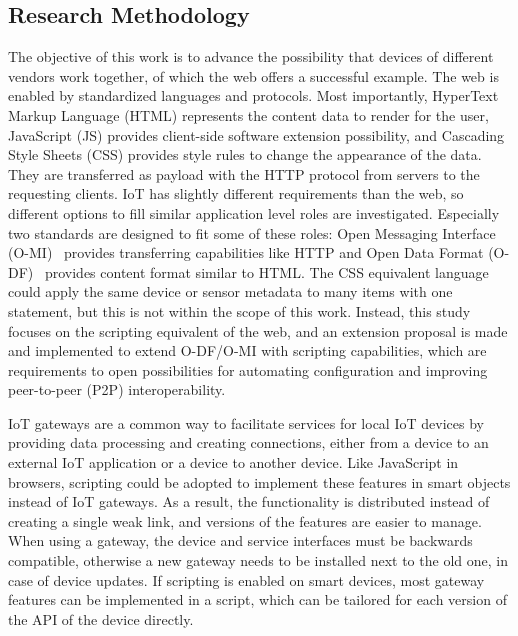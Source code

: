 




\subsection*{Research Methodology}

The objective of this work is to advance the possibility that devices of different vendors work together, of which the web offers a successful example. The web is enabled by standardized languages and protocols. Most importantly, HyperText Markup Language (HTML) represents the content data to render for the user, JavaScript (JS) provides client-side software extension possibility, and Cascading Style Sheets (CSS) provides style rules to change the appearance of the data. They are transferred as payload with the HTTP protocol from servers to the requesting clients. IoT has slightly different requirements than the web, so different options to fill similar application level roles are investigated. Especially two standards are designed to fit some of these roles: Open Messaging Interface (O-MI)~\cite{o-mi} provides transferring capabilities like HTTP and Open Data Format (O-DF)~\cite{o-df} provides content format similar to HTML. The CSS equivalent language could apply the same device or sensor metadata to many items with one statement, but this is not within the scope of this work. Instead, this study focuses on the scripting equivalent of the web, and an extension proposal is made and implemented to extend O-DF/O-MI with scripting capabilities, which are requirements to open possibilities for automating configuration and improving peer-to-peer (P2P) interoperability.

IoT gateways are a common way to facilitate services for local IoT devices by providing data processing and creating connections, either from a device to an external IoT application or a device to another device. Like JavaScript in browsers, scripting could be adopted to implement these features in smart objects instead of IoT gateways. As a result, the functionality is distributed instead of creating a single weak link, and versions of the features are easier to manage. When using a gateway, the device and service interfaces must be backwards compatible, otherwise a new gateway needs to be installed next to the old one, in case of device updates. If scripting is enabled on smart devices, most gateway features can be implemented in a script, which can be tailored for each version of the API of the device directly.

